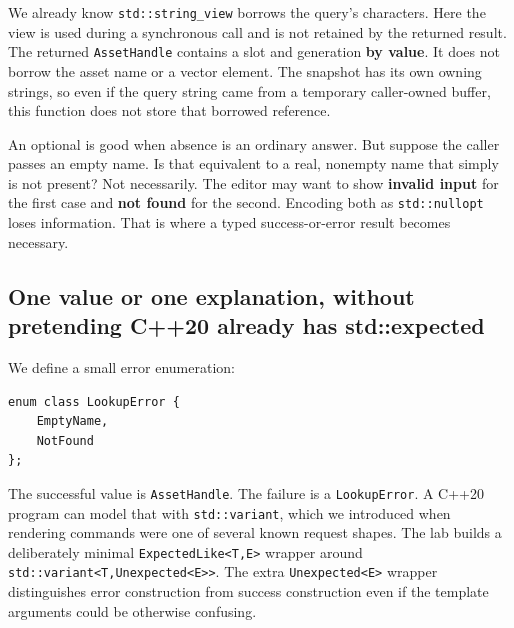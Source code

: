 We already know \texttt{std::string\_view} borrows the query's characters. Here the view is used during a synchronous call and is not retained by the returned result. The returned \texttt{AssetHandle} contains a slot and generation \textbf{by value}. It does not borrow the asset name or a vector element. The snapshot has its own owning strings, so even if the query string came from a temporary caller-owned buffer, this function does not store that borrowed reference.

An optional is good when absence is an ordinary answer. But suppose the caller passes an empty name. Is that equivalent to a real, nonempty name that simply is not present? Not necessarily. The editor may want to show \textbf{invalid input} for the first case and \textbf{not found} for the second. Encoding both as \texttt{std::nullopt} loses information. That is where a typed success-or-error result becomes necessary.

\subsection{One value or one explanation, without pretending C++20 already has std::expected}\label{05-engine-i-ch006-one-value-or-one-explanation-without-pretending-c20-already-has-stdexpected}

We define a small error enumeration:

\begin{verbatim}
enum class LookupError {
    EmptyName,
    NotFound
};
\end{verbatim}

The successful value is \texttt{AssetHandle}. The failure is a \texttt{LookupError}. A C++20 program can model that with \texttt{std::variant}, which we introduced when rendering commands were one of several known request shapes. The lab builds a deliberately minimal \texttt{ExpectedLike\textless{}T,E\textgreater{}} wrapper around \texttt{std::variant\textless{}T,Unexpected\textless{}E\textgreater{}\textgreater{}}. The extra \texttt{Unexpected\textless{}E\textgreater{}} wrapper distinguishes error construction from success construction even if the template arguments could be otherwise confusing.

